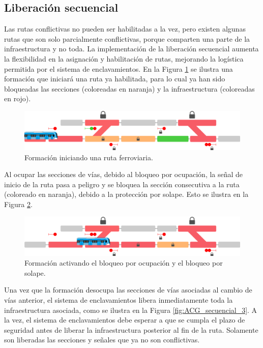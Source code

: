 \subsection{Liberación secuencial}

	\label{sec:ACG_liberacion}
	
	Las rutas conflictivas no pueden ser habilitadas a la vez, pero existen algunas rutas que son solo parcialmente conflictivas, porque comparten una parte de la infraestructura y no toda. La implementación de la liberación secuencial aumenta la flexibilidad en la asignación y habilitación de rutas, mejorando la logística permitida por el sistema de enclavamientos. En la Figura \ref{fig:ACG_secuencial_1} se ilustra una formación que iniciará una ruta ya habilitada, para lo cual ya han sido bloqueadas las secciones (coloreadas en naranja) y la infraestructura (coloreadas en rojo).
	
	 \begin{figure}[!h]
	     \centering
	     \includegraphics[width=1\textwidth]{Figuras/secuencial_1}
	     \centering\caption{Formación iniciando una ruta ferroviaria.}
	     \label{fig:ACG_secuencial_1}
	 \end{figure}
 
	Al ocupar las secciones de vías, debido al bloqueo por ocupación, la señal de inicio de la ruta pasa a peligro y se bloquea la sección consecutiva a la ruta (coloreado en naranja), debido a la protección por solape. Esto se ilustra en la Figura \ref{fig:ACG_secuencial_2}.
	
	\begin{figure}[!h]
    	 \centering
	     \includegraphics[width=1\textwidth]{Figuras/secuencial_2}
    	 \centering\caption{Formación activando el bloqueo por ocupación y el bloqueo por solape.}
    	 \label{fig:ACG_secuencial_2}
	\end{figure}
 
 	Una vez que la formación desocupa las secciones de vías asociadas al cambio de vías anterior, el sistema de enclavamientos libera inmediatamente toda la infraestructura asociada, como se ilustra en la Figura \ref{fig:ACG_secuencial_3}. A la vez, el sistema de enclavamientos debe esperar a que se cumpla el plazo de seguridad antes de liberar la infraestructura posterior al fin de la ruta. Solamente son liberadas las secciones y señales que ya no son conflictivas.
	   
